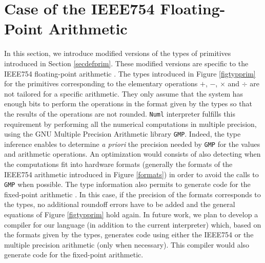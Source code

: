 
\section{Case of the IEEE754 Floating-Point Arithmetic}
\label{ieee}

In this section, we introduce modified versions of the types of primitives introduced in Section
\ref{secdefprim}. These modified versions are specific to the IEEE754 floating-point arithmetic \cite{IEEE754}.
The types introduced in Figure \ref{figtypprim} for the primitives corresponding to the elementary operations
$+$, $-$, $\times$ and $\div$ are not tailored for a specific arithmetic. They only assume
that the system has enough bits to perform the operations in the format given by
the types so that the results of the operations are not rounded. \texttt{Numl} interpreter 
fulfills this requirement by performing all the numerical computations in multiple precision,
using the GNU Multiple Precision Arithmetic library \texttt{GMP}.
Indeed, the type inference enables to determine \textit{a priori} the precision needed by \texttt{GMP} for the
values and arithmetic operations. An optimization would consists of also detecting when the
computations fit into hardware formats (generally the formats of the IEEE754 arithmetic introduced in Figure
\ref{formats}) in order to avoid the calls to \texttt{GMP} when possible. The type information
also permits to generate code for the fixed-point arithmetic \cite{MENTOR}. In this case,
if the precision of the formats corresponds to the types, no additional roundoff errors have to be added
and the general equations of Figure \ref{figtypprim} hold again.
In future work, we plan to develop a compiler for our language (in addition to the current interpreter)
which, based on the formats given by the types,  generates code using either the IEEE754 or the multiple precision arithmetic (only when necessary).
This compiler would also generate code for the fixed-point arithmetic. 


